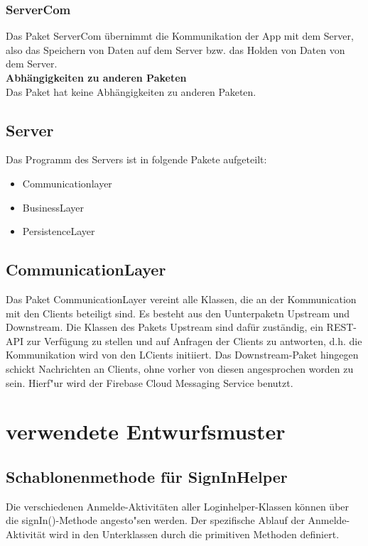 \subsubsection{ServerCom}
Das Paket ServerCom übernimmt die Kommunikation der App mit dem Server, also das Speichern von Daten auf dem Server bzw. das Holden von Daten von dem Server.\\

\textbf{Abhängigkeiten zu anderen Paketen}\\
Das Paket hat keine Abhängigkeiten zu anderen Paketen.

\subsection{Server}
Das Programm des Servers ist in folgende Pakete aufgeteilt:
\begin{itemize}
	\item Communicationlayer
	\item BusinessLayer
	\item PersistenceLayer
\end{itemize}

\subsection{CommunicationLayer}
Das Paket CommunicationLayer vereint alle Klassen, die an der Kommunication mit den Clients beteiligt sind. Es besteht aus den Uunterpaketn Upstream und Downstream. Die Klassen des Pakets Upstream sind dafür zuständig, ein REST-API zur Verfügung zu stellen und auf Anfragen der Clients zu antworten, d.h. die Kommunikation wird von den LCients initiiert. Das Downstream-Paket hingegen schickt Nachrichten an Clients, ohne vorher von diesen angesprochen worden zu sein. Hierf"ur wird der Firebase Cloud Messaging Service benutzt.

\section{verwendete Entwurfsmuster}

\subsection{Schablonenmethode für SignInHelper}
Die verschiedenen Anmelde-Aktivitäten aller Loginhelper-Klassen können über die signIn()-Methode angesto"sen werden. Der spezifische Ablauf der Anmelde-Aktivität wird in den Unterklassen durch die primitiven Methoden definiert. \\

